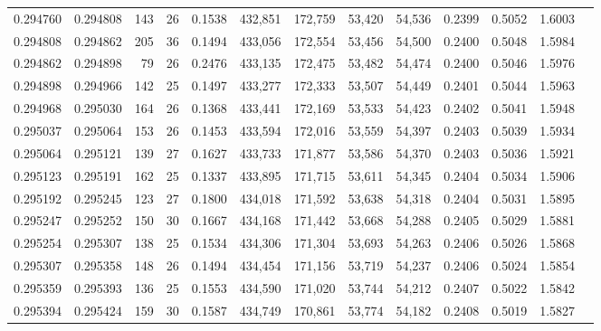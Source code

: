 \begin{tabular}{rrrrrrrrrrrrr}
0.294760 & 0.294808 &   143 &  26 &                                     0.1538 & 432,851 & 172,759 &  53,420 &  54,536 & 0.2399 & 0.5052 & 1.6003 \\
0.294808 & 0.294862 &   205 &  36 &                                     0.1494 & 433,056 & 172,554 &  53,456 &  54,500 & 0.2400 & 0.5048 & 1.5984 \\
0.294862 & 0.294898 &    79 &  26 &                                     0.2476 & 433,135 & 172,475 &  53,482 &  54,474 & 0.2400 & 0.5046 & 1.5976 \\
0.294898 & 0.294966 &   142 &  25 &                                     0.1497 & 433,277 & 172,333 &  53,507 &  54,449 & 0.2401 & 0.5044 & 1.5963 \\
0.294968 & 0.295030 &   164 &  26 &                                     0.1368 & 433,441 & 172,169 &  53,533 &  54,423 & 0.2402 & 0.5041 & 1.5948 \\
0.295037 & 0.295064 &   153 &  26 &                                     0.1453 & 433,594 & 172,016 &  53,559 &  54,397 & 0.2403 & 0.5039 & 1.5934 \\
0.295064 & 0.295121 &   139 &  27 &                                     0.1627 & 433,733 & 171,877 &  53,586 &  54,370 & 0.2403 & 0.5036 & 1.5921 \\
0.295123 & 0.295191 &   162 &  25 &                                     0.1337 & 433,895 & 171,715 &  53,611 &  54,345 & 0.2404 & 0.5034 & 1.5906 \\
0.295192 & 0.295245 &   123 &  27 &                                     0.1800 & 434,018 & 171,592 &  53,638 &  54,318 & 0.2404 & 0.5031 & 1.5895 \\
0.295247 & 0.295252 &   150 &  30 &                                     0.1667 & 434,168 & 171,442 &  53,668 &  54,288 & 0.2405 & 0.5029 & 1.5881 \\
0.295254 & 0.295307 &   138 &  25 &                                     0.1534 & 434,306 & 171,304 &  53,693 &  54,263 & 0.2406 & 0.5026 & 1.5868 \\
0.295307 & 0.295358 &   148 &  26 &                                     0.1494 & 434,454 & 171,156 &  53,719 &  54,237 & 0.2406 & 0.5024 & 1.5854 \\
0.295359 & 0.295393 &   136 &  25 &                                     0.1553 & 434,590 & 171,020 &  53,744 &  54,212 & 0.2407 & 0.5022 & 1.5842 \\
0.295394 & 0.295424 &   159 &  30 &                                     0.1587 & 434,749 & 170,861 &  53,774 &  54,182 & 0.2408 & 0.5019 & 1.5827 \\

\end{tabular}
